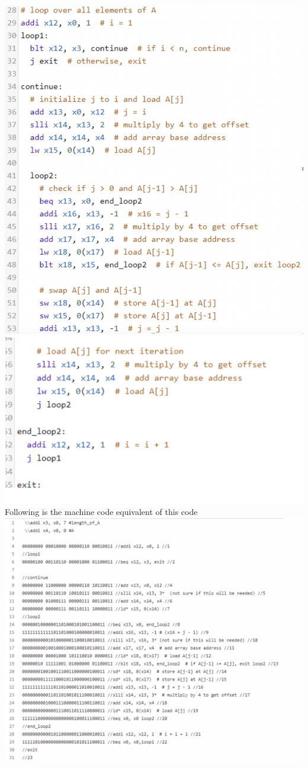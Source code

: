 \documentclass[a4paper, 12pt]{report}
\begin{document}
\\\includegraphics[scale = 0.5]{is2.png}
\\\includegraphics[scale = 0.5]{is3.png}
\\Following is the machine code equivalent of this code
\\\includegraphics[scale = 0.5]{mc.png}
\end{document}
